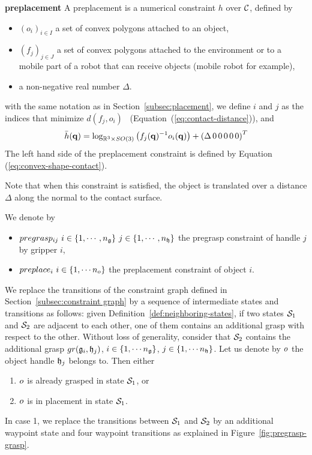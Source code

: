 \begin{definition}\label{def:preplacement}\textbf{preplacement}
  A preplacement is a numerical constraint $h$ over $\mathcal{C}$, defined by
  \begin{itemize}
  \item $(o_i)_{i\in I}$ a set of convex polygons attached to an object,
  \item $(f_j)_{j\in J}$ a set of convex polygons attached to the environment or to a mobile part of a robot that can receive objects (mobile robot for example),
  \item a non-negative real number $\Delta$.
  \end{itemize}
  with the same notation as in Section~\ref{subsec:placement}, we define $i$ and
  $j$ as the indices that minimize $d(f_j,o_i)$~
  (Equation~(\ref{eq:contact-distance})), and
  \begin{equation}\label{eq:convex-shape-contact-hbar-preplacement}
    \bar{h}(\conf) = \log_{\reals^3\times SO(3)} \left(f_{j}(\conf)^{-1}o_i(\conf)\right) + \left(\Delta\,0\,0\,0\,0\,0\right)^T
  \end{equation}
  The left hand side of the preplacement constraint is defined by Equation~
  (\ref{eq:convex-shape-contact}).
\end{definition}
Note that when this constraint is satisfied, the object is translated over a
distance $\Delta$ along the normal to the contact surface.

We denote by
\begin{itemize}
\item $pregrasp_{ij}\ i\in\{1,\cdots,\ngrippers\}\ j\in\{1,\cdots,\nhandles\}$ the pregrasp constraint of handle $j$ by gripper $i$,
\item $preplace_{i}\ i\in\{1,\cdots\nobjects\}$ the preplacement constraint of object $i$.
\end{itemize}

We replace the transitions of the constraint graph defined in
Section~\ref{subsec:constraint graph} by a sequence of intermediate
states and transitions as follows: given
Definition~\ref{def:neighboring-states}, if two states $\mathcal{S}_1$
and $\mathcal{S}_2$ are adjacent to each other, one of them contains an additional grasp with
respect to the other. Without loss of generality, consider that
$\mathcal{S}_2$ contains the additional grasp $gr(\mathfrak{g}_i,\mathfrak{h}_j)$,
$i\in\{1,\cdots n_{\mathfrak{g}}\}$, $j\in\{1,\cdots n_{\mathfrak{h}}\}$. Let us denote by
$o_{}$ the object handle $\mathfrak{h}_j$ belongs to. Then either
\begin{enumerate}
\item $o_{}$ is already grasped in state $\mathcal{S}_1$, or
\item $o_{}$ is in placement in  state $\mathcal{S}_1$.
\end{enumerate}
In case 1, we replace the transitions between $\mathcal{S}_1$ and $\mathcal{S}_2$ by an additional waypoint state and four waypoint transitions as explained in Figure~\ref{fig:pregrasp-grasp}.

